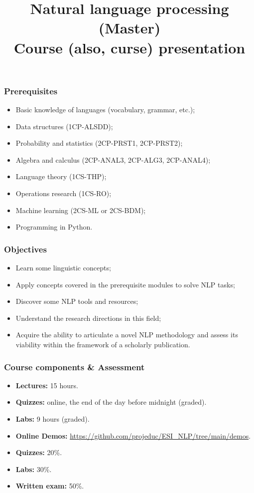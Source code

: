 \documentclass{beamer}
\title[ESI - NLP\_master: Presentation] %
{Natural language processing (Master)\\Course (also, curse) presentation}
\begin{document}
 

\begin{frame}
\frametitle{Prerequisites}

\begin{itemize}
	\item Basic knowledge of languages (vocabulary, grammar, etc.);
	\item Data structures (1CP-ALSDD);
	\item Probability and statistics (2CP-PRST1, 2CP-PRST2);
	\item Algebra and calculus (2CP-ANAL3, 2CP-ALG3, 2CP-ANAL4);
	\item Language theory (1CS-THP);
	\item Operations research (1CS-RO);
	\item Machine learning (2CS-ML or 2CS-BDM);
	\item Programming in Python.
\end{itemize}

\end{frame}


\begin{frame}
\frametitle{Objectives}

\begin{itemize}
	\item Learn some linguistic concepts;
	\item Apply concepts covered in the prerequisite modules to solve NLP tasks;
	\item Discover some NLP tools and resources;
	\item Understand the research directions in this field;
	\item Acquire the ability to articulate a novel NLP methodology and assess its viability within the framework of a scholarly publication.
\end{itemize}

\end{frame}


\begin{frame}
\frametitle{Course components \& Assessment}

\begin{itemize}
	\item \textbf{Lectures:} 15 hours.
	\item \textbf{Quizzes:} online, the end of the day before midnight (graded).
	\item \textbf{Labs:} 9 hours (graded).
	\item \textbf{Online Demos:} {\scriptsize\url{https://github.com/projeduc/ESI_NLP/tree/main/demos}}.
\end{itemize}

\vfill

\begin{itemize}
	\item \textbf{Quizzes:} 20\%.
	\item \textbf{Labs:} 30\%.
	\item \textbf{Written exam:} 50\%.
\end{itemize}

\end{frame}
\end{document}
